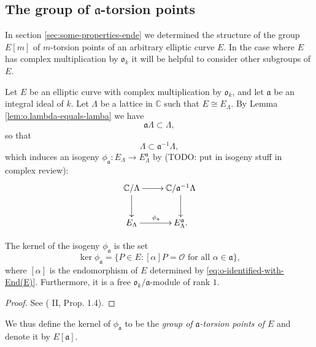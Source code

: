 \subsection{The group of $\mathfrak{a}$-torsion points}
\label{sec:group-a-tors}

In section \ref{sec:some-properties-ende} we determined the structure of the group
$E[m]$ of $m$-torsion points of an arbitrary elliptic curve $E$.  In the case where
$E$ has complex multiplication by $\mathfrak{o}_{k}$ it will be helpful to consider
other subgroups of $E$.

Let $E$ be an elliptic curve with complex multiplication by $\mathfrak{o}_{k}$, and
let $\mathfrak{a}$ be an integral ideal of $k$.  Let $\Lambda$ be a lattice in
$\mathbb{C}$ such that $E \cong E_{\Lambda}$.  By Lemma
\ref{lem:o.lambda-equals-lamba} we have
\begin{equation*}
  \mathfrak{a}\Lambda \subset \Lambda,
\end{equation*}
so that
\begin{equation*}
  \Lambda \subset \mathfrak{a}^{-1}\Lambda,
\end{equation*}
which induces an isogeny $\phi_{\mathfrak{a}} : E_{\Lambda} \rightarrow
E_{\Lambda}^{\mathfrak{a}}$ by (TODO: put in isogeny stuff in complex review):
\begin{equation*}
  \xymatrix{
    \mathbb{C} / \Lambda \ar[d] \ar[r] & \mathbb{C} / \mathfrak{a}^{-1}\Lambda \ar[d] \\
    E_{\Lambda} \ar[r]^{\phi_{\mathfrak{a}}} & E_{\Lambda}^{\mathfrak{a}}.
  }
\end{equation*}
\begin{prop}
  \label{prop:a-torsion-is-kernel}
  The kernel of the isogeny $\phi_{\mathfrak{a}}$ is the set
  \begin{equation*}
    \ker{\phi_{\mathfrak{a}}} = \{ P \in E : [\alpha]P = \mathcal{O} \text{ for all } \alpha
    \in \mathfrak{a} \},
  \end{equation*}
  where $[\alpha]$ is the endomorphism of $E$ determined by
  \eqref{eq:o-identified-with-End(E)}.  Furthermore, it is a free $\mathfrak{o}_{k} /
  \mathfrak{a}$-module of rank $1$.
\end{prop}
\begin{proof}
  See (\cite{silverman94} II, Prop. 1.4).
\end{proof}

We thus define the kernel of $\phi_{\mathfrak{a}}$ to be the \emph{group of
  $\mathfrak{a}$-torsion points of $E$} and denote it by $E[\mathfrak{a}]$.

